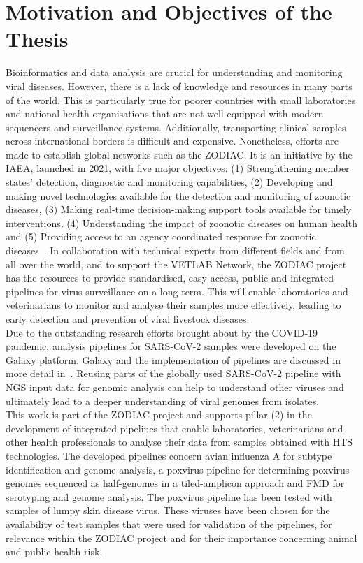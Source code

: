 \section{Motivation and Objectives of the Thesis}
Bioinformatics and data analysis are crucial for understanding and monitoring viral diseases. However, there is a lack of knowledge and resources in many parts of the world. This is particularly true for poorer countries with small laboratories and national health organisations that are not well equipped with modern sequencers and surveillance systems. Additionally, transporting clinical samples across international borders is difficult and expensive. Nonetheless, efforts are made to establish global networks such as the \ac{ZODIAC}. It is an initiative by the \ac{IAEA}, launched in 2021, with five major objectives: (1) Strenghthening member states' detection, diagnostic and monitoring capabilities, (2) Developing and making novel technologies available for the detection and monitoring of zoonotic diseases, (3) Making real-time decision-making support tools available for timely interventions, (4) Understanding the impact of zoonotic diseases on human health and (5) Providing access to an agency coordinated response for zoonotic diseases~\cite{zodiac2021}. In collaboration with technical experts from different fields and from all over the world, and to support the \ac{VETLAB} Network, the \ac{ZODIAC} project has the resources to provide standardised, easy-access, public and integrated pipelines for virus surveillance on a long-term. This will enable laboratories and veterinarians to monitor and analyse their samples more effectively, leading to early detection and prevention of viral livestock diseases. \\
Due to the outstanding research efforts brought about by the \ac{COVID-19} pandemic, analysis pipelines for \ac{SARS-CoV-2} samples were developed on the Galaxy platform. Galaxy and the implementation of pipelines are discussed in more detail in~. Reusing parts of the globally used \ac{SARS-CoV-2} pipeline with NGS input data for genomic analysis can help to understand other viruses and ultimately lead to a deeper understanding of viral genomes from isolates. \\
This work is part of the \ac{ZODIAC} project and supports pillar (2) in the development of integrated pipelines that enable laboratories, veterinarians and other health professionals to analyse their data from samples obtained with \ac{HTS} technologies. The developed pipelines concern avian influenza A for subtype identification and genome analysis, a poxvirus pipeline for determining poxvirus genomes sequenced as half-genomes in a tiled-amplicon approach and \ac{FMD} for serotyping and genome analysis. The poxvirus pipeline has been tested with samples of lumpy skin disease virus. These viruses have been chosen for the availability of test samples that were used for validation of the pipelines, for relevance within the ZODIAC project and for their importance concerning animal and public health risk. \\
